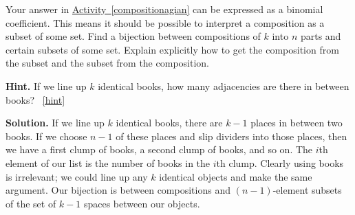 \documentclass{book}
\begin{document}
\setcounter{project}{129}
\addtocounter{project}{-1}
\begin{activity}[]\label{activity-122}
\hypertarget{p-881}{}%
Your answer in \hyperref[compositionagian]{Activity~\ref{compositionagian}} can be expressed as a binomial coefficient. This means it should be possible to interpret a composition as a subset of some set. Find a bijection between compositions of \(k\) into \(n\) parts and certain subsets of some set.  Explain explicitly how to get the composition from the subset and the subset from the composition.%
\par\smallskip%
\noindent\textbf{Hint.}\hypertarget{hint-87}{}\quad%
\hypertarget{p-882}{}%
If we line up \(k\) identical books, how many adjacencies are there in between books?%
~\hfill{\tiny\hyperlink{a-129}{[hint]}\hypertarget{q-129}{}}\par\smallskip%
\noindent\textbf{Solution.}\hypertarget{solution-77}{}\quad%
\hypertarget{p-883}{}%
If we line up \(k\) identical books, there are \(k-1\) places in between two books. If we choose \(n-1\) of these places and slip dividers into those places, then we have a first clump of books, a second clump of books, and so on. The \(i\)th element of our list is the number of books in the \(i\)th clump. Clearly using books is irrelevant; we could line up any \(k\) identical objects and make the same argument. Our bijection is between compositions and \((n-1)\)-element subsets of the set of \(k-1\) spaces between our objects.%
\end{activity}

\clearpage
\end{document}

